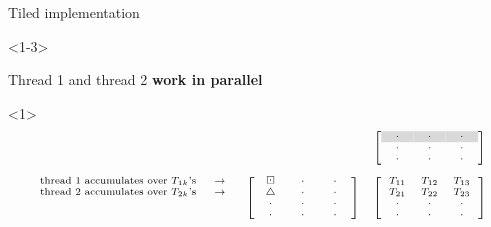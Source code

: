 \documentclass[12pt,aspectratio=1610]{beamer}
\begin{document}
\begin{frame}{Tiled implementation}

\begin{onlyenv}<1-3>

Thread 1 and thread 2 \textbf{work in parallel}

\vspace{-0.3cm}

\begin{onlyenv}<1>
\[
\scriptsize
\begin{array}{ccc}
&& \left[\begin{array}{ccc}
\ \ \cl{\cdot} \ \ & \ \ \cl{\cdot} \ \  & \ \ \cl{\cdot} \ \ \\
\ \ \cdot \ \ & \ \ \cdot \ \  & \ \ \cdot \ \ \\
\ \ \cdot \ \ & \ \ \cdot \ \  & \ \ \cdot \ \ \\
\end{array}\right]\\
\\
\begin{array}{r}
\text{thread 1 accumulates over $T_{1k}$'s} \ \ \ \ \rw\\
\text{thread 2 accumulates over $T_{2k}$'s} \ \ \ \ \rw\\
\\
\\
\end{array}
& \left[\begin{array}{ccc}
\bd & \ \ \cdot \ \  & \ \ \cdot \ \  \\
\uptri & \ \ \cdot \ \  & \ \ \cdot \ \  \\
\ \ \cdot \ \ & \ \ \cdot \ \  & \ \ \cdot \ \ \\
\ \ \cdot \ \ & \ \ \cdot \ \  & \ \ \cdot \ \ \\
\end{array}\right]
& \left[\begin{array}{ccc}
T_{11} & T_{12} & T_{13} \\
T_{21} & T_{22} & T_{23} \\
\ \ \cdot \ \ & \ \ \cdot \ \  & \ \ \cdot \ \ \\
\ \ \cdot \ \ & \ \ \cdot \ \  & \ \ \cdot \ \ \\
\end{array}\right]
\end{array}
\]
\end{onlyenv}


\end{onlyenv}
\end{frame}
\end{document}
